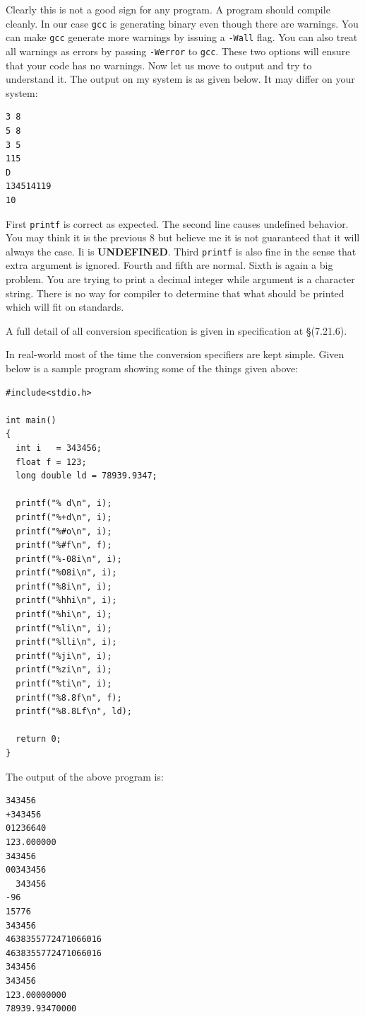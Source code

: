 Clearly this is not a good sign for any program. A program should compile
cleanly. In our case \texttt{gcc} is generating binary even though there are
warnings. You can make \texttt{gcc} generate more warnings by issuing a
\texttt{-Wall} flag. You can also treat all warnings as errors by passing
\texttt{-Werror} to \texttt{gcc}. These two options will ensure that your code
has no warnings. Now let us move to output and try to understand it. The output
on my system is as given below. It may differ on your system:

\begin{Verbatim}[frame=single]
3 8
5 8
3 5
115
D
134514119
10
\end{Verbatim}

First \texttt{printf} is correct as expected. The second line causes undefined
behavior. You may think it is the previous 8 but believe me it is not
guaranteed that it will always the case. Ii is \textbf{UNDEFINED}. Third
\texttt{printf} is also fine in the sense that extra argument is
ignored. Fourth and fifth are normal. Sixth is again a big problem. You are
trying to print a decimal integer while argument is a character string. There
is no way for compiler to determine that what should be printed which will fit
on standards.

A full detail of all conversion specification is given in specification at \S(7.21.6).

In real-world most of the time the conversion specifiers are kept simple. Given
below is a sample program showing some of the things given above:

\begin{Verbatim}[frame=single]
#include<stdio.h>

int main()
{
  int i   = 343456;
  float f = 123;
  long double ld = 78939.9347;

  printf("% d\n", i);
  printf("%+d\n", i);
  printf("%#o\n", i);
  printf("%#f\n", f);
  printf("%-08i\n", i);
  printf("%08i\n", i);
  printf("%8i\n", i);
  printf("%hhi\n", i);
  printf("%hi\n", i);
  printf("%li\n", i);
  printf("%lli\n", i);
  printf("%ji\n", i);
  printf("%zi\n", i);
  printf("%ti\n", i);
  printf("%8.8f\n", f);
  printf("%8.8Lf\n", ld);

  return 0;
}
\end{Verbatim}

The output of the above program is:

\begin{Verbatim}[frame=single]
 343456
+343456
01236640
123.000000
343456
00343456
  343456
-96
15776
343456
4638355772471066016
4638355772471066016
343456
343456
123.00000000
78939.93470000
\end{Verbatim}

